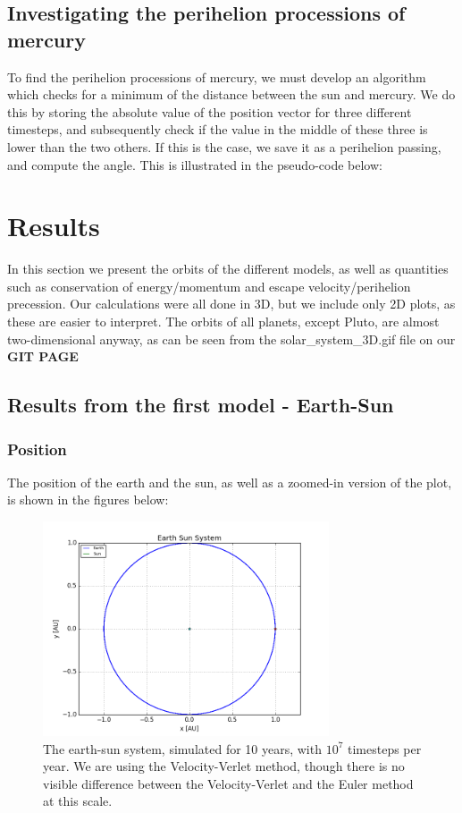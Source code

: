 \documentclass[a4paper, 10pt]{article}
\begin{document}
\subsection{Investigating the perihelion processions of mercury}
To find the perihelion processions of mercury, we must develop an algorithm which checks for a minimum of the distance between the sun and mercury. We do this by storing the absolute value of the position vector for three different timesteps, and subsequently check if the value in the middle of these three is lower than the two others. If this is the case, we save it as a perihelion passing, and compute the angle. This is illustrated in the pseudo-code below:


\section{Results}
In this section we present the orbits of the different models, as well as quantities such as conservation of energy/momentum and escape velocity/perihelion precession. Our calculations were all done in 3D, but we include only 2D plots, as these are easier to interpret. The orbits of all planets, except Pluto, are almost two-dimensional anyway, as can be seen from the solar\_system\_3D.gif file on our \textbf{GIT PAGE}
\subsection{Results from the first model - Earth-Sun}
\subsubsection{Position}
The position of the earth and the sun, as well as a zoomed-in version of the plot, is shown in the figures below:
\begin{figure}[t!]\label{fig:earth-sun-figure1}
    \centering
    \includegraphics[height=2.5in]{earthsun.png}
    \caption{The earth-sun system, simulated for 10 years, with $10^7$ timesteps per year. We are using the Velocity-Verlet method, though there is no visible difference between the Velocity-Verlet and the Euler method at this scale.}
\end{figure}
\end{document}
